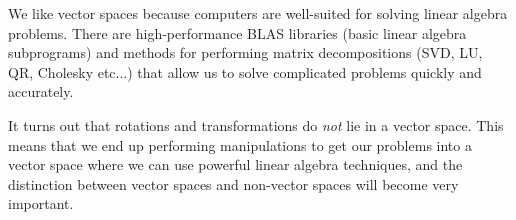 %

We like vector spaces because computers are well-suited for solving
linear algebra problems. There are high-performance BLAS libraries
(basic linear algebra subprograms) and methods for performing matrix
decompositions (SVD, LU, QR, Cholesky etc...) that allow us to solve
complicated problems quickly and accurately. 

It turns out that rotations and transformations do \emph{not} lie
in a vector space. This means that we end up performing manipulations
to get our problems into a vector space where we can use powerful
linear algebra techniques, and the distinction between vector spaces
and non-vector spaces will become very important.

